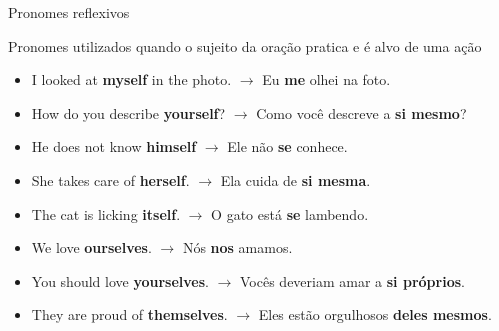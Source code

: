 \documentclass[compress,mathserif,xcolor=table]{beamer}
\begin{document}
\begin{frame}{Pronomes reflexivos}

Pronomes utilizados quando o sujeito da oração pratica e é alvo de uma ação

\vspace{0.5cm}

\begin{itemize}
    \item  I looked at \textbf{myself} in the photo. $\rightarrow$ Eu \textbf{me} olhei na foto.
    \item How do you describe \textbf{yourself}? $\rightarrow$ Como você descreve a \textbf{si mesmo}?
    \item He does not know \textbf{himself} $\rightarrow$ Ele não \textbf{se} conhece.
    \item She takes care of \textbf{herself}. $\rightarrow$ Ela cuida de \textbf{si mesma}.
    \item The cat is licking \textbf{itself}. $\rightarrow$ O gato está \textbf{se} lambendo.
    \item We love \textbf{ourselves}. $\rightarrow$ Nós \textbf{nos} amamos.
    \item You should love \textbf{yourselves}. $\rightarrow$ Vocês deveriam amar a \textbf{si próprios}.
    \item They are proud of \textbf{themselves}. $\rightarrow$ Eles estão orgulhosos \textbf{deles mesmos}.
\end{itemize}

\end{frame}

\end{document}
